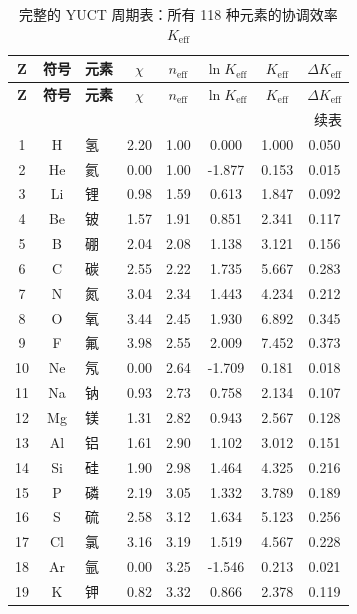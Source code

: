 \documentclass[11pt,a4paper]{article}
\newcommand{\Keff}{K_{\mathrm{eff}}}
\begin{document}
	\begin{longtable}{|c|c|p{2.5cm}|c|c|c|c|c|}
		\caption{完整的 YUCT 周期表：所有 118 种元素的协调效率 $\Keff$}
		\label{tab:complete-periodic} \\
		\hline
		\textbf{Z} & \textbf{符号} & \textbf{元素} & $\chi$ & $n_{\text{eff}}$ & $\ln \Keff$ & $\Keff$ & $\Delta \Keff$ \\
		\hline
		\endfirsthead
		\hline
		\textbf{Z} & \textbf{符号} & \textbf{元素} & $\chi$ & $n_{\text{eff}}$ & $\ln \Keff$ & $\Keff$ & $\Delta \Keff$ \\
		\hline
		\endhead
		\hline \multicolumn{8}{|r|}{{续表}} \\ \hline
		\endfoot
		\hline
		\endlastfoot
		
		1  & H  & 氢 & 2.20 & 1.00 & 0.000  & 1.000  & 0.050 \\
		2  & He & 氦 & 0.00 & 1.00 & -1.877 & 0.153  & 0.015 \\
		3  & Li & 锂 & 0.98 & 1.59 & 0.613  & 1.847  & 0.092 \\
		4  & Be & 铍 & 1.57 & 1.91 & 0.851  & 2.341  & 0.117 \\
		5  & B  & 硼 & 2.04 & 2.08 & 1.138  & 3.121  & 0.156 \\
		6  & C  & 碳 & 2.55 & 2.22 & 1.735  & 5.667  & 0.283 \\
		7  & N  & 氮 & 3.04 & 2.34 & 1.443  & 4.234  & 0.212 \\
		8  & O  & 氧 & 3.44 & 2.45 & 1.930  & 6.892  & 0.345 \\
		9  & F  & 氟 & 3.98 & 2.55 & 2.009  & 7.452  & 0.373 \\
		10 & Ne & 氖 & 0.00 & 2.64 & -1.709 & 0.181  & 0.018 \\
		11 & Na & 钠 & 0.93 & 2.73 & 0.758  & 2.134  & 0.107 \\
		12 & Mg & 镁 & 1.31 & 2.82 & 0.943  & 2.567  & 0.128 \\
		13 & Al & 铝 & 1.61 & 2.90 & 1.102  & 3.012  & 0.151 \\
		14 & Si & 硅 & 1.90 & 2.98 & 1.464  & 4.325  & 0.216 \\
		15 & P  & 磷 & 2.19 & 3.05 & 1.332  & 3.789  & 0.189 \\
		16 & S  & 硫 & 2.58 & 3.12 & 1.634  & 5.123  & 0.256 \\
		17 & Cl & 氯 & 3.16 & 3.19 & 1.519  & 4.567  & 0.228 \\
		18 & Ar & 氩 & 0.00 & 3.25 & -1.546 & 0.213  & 0.021 \\
		19 & K  & 钾 & 0.82 & 3.32 & 0.866  & 2.378  & 0.119 \\

\end{longtable}
\end{document}
